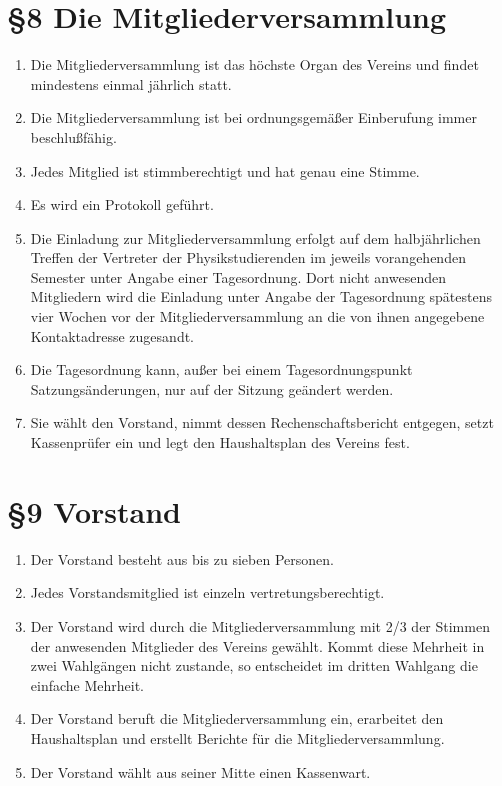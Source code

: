 \documentclass[ngerman]{article}
\begin{document}
\section*{§8 Die Mitgliederversammlung}
\begin{enumerate}
 \item Die Mitgliederversammlung ist das höchste Organ des Vereins und findet mindestens einmal jährlich statt.
 \item Die Mitgliederversammlung ist bei ordnungsgemäßer Einberufung immer
  beschlußfähig.
 \item Jedes Mitglied ist stimmberechtigt und hat genau eine Stimme.
 \item Es wird ein Protokoll geführt.
 \item Die Einladung zur Mitgliederversammlung erfolgt auf dem halbjährlichen Treffen der Vertreter der Physikstudierenden im jeweils vorangehenden Semester unter
 Angabe einer Tagesordnung. Dort nicht anwesenden Mitgliedern wird die Einladung unter
 Angabe der Tagesordnung spätestens vier Wochen vor der Mitgliederversammlung an die von ihnen angegebene Kontaktadresse zugesandt.

 \item Die Tagesordnung kann, außer bei einem Tagesordnungspunkt \glqq Satzungsänderungen\grqq, nur auf der Sitzung geändert werden.
 \item Sie wählt den Vorstand, nimmt dessen Rechenschaftsbericht entgegen, setzt Kassenprüfer ein und legt den Haushaltsplan des Vereins fest.
\end{enumerate}


\section*{§9 Vorstand}
\begin{enumerate}
 \item Der Vorstand besteht aus bis zu sieben Personen.
 \item Jedes Vorstandsmitglied ist einzeln vertretungsberechtigt.
 \item Der Vorstand wird durch die Mitgliederversammlung mit 2/3 der Stimmen der anwesenden Mitglieder des Vereins gewählt. Kommt diese Mehrheit in zwei Wahlgängen nicht zustande, so entscheidet im dritten Wahlgang die einfache Mehrheit.
 \item Der Vorstand beruft die Mitgliederversammlung ein, erarbeitet den Haushaltsplan und erstellt Berichte für die Mitgliederversammlung.
 \item Der Vorstand wählt aus seiner Mitte einen Kassenwart.
\end{enumerate}
\end{document}
